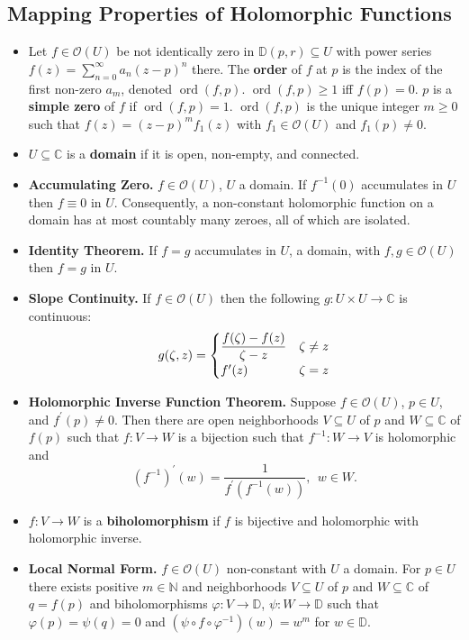 \documentclass{article}
\DeclareMathOperator{\order}{ord}
\newenvironment{topic}[1]{%
{\subsection{#1}}%
\begin{itemize}%
}{%
\end{itemize}%
}
\newcommand{\theorem}[1]{\item {\bf #1.}}
\newcommand{\lemma}[1]{\item {\bf #1.}}
\newcommand{\term}[1]{{\bf #1}}
\newcommand{\holo}[1]{\mathcal{O}(#1)}
\newcommand{\remark}{\item}
\newcommand{\udisk}{\mathbb{D}}
\newcommand{\disk}[2]{\mathbb{D}(#1, #2)}
\begin{document}
\begin{topic}{Mapping Properties of Holomorphic Functions}

\remark Let $f \in \holo{U}$ be not identically zero in $\disk{p}{r} \subseteq U$ with power series $f(z) = \sum_{n=0}^\infty a_n (z - p)^n$ there. The \term{order} of $f$ at $p$ is the index of the first non-zero $a_m$, denoted $\order(f, p)$. $\order(f, p) \geq 1$ iff $f(p) = 0$. $p$ is a \term{simple zero} of $f$ if $\order(f, p) = 1$. $\order(f, p)$ is the unique integer $m \geq 0$ such that $f(z) = (z - p)^m f_1(z)$ with $f_1 \in \holo{U}$ and $f_1(p) \neq 0$.

\remark $U \subseteq \mathbb{C}$ is a \term{domain} if it is open, non-empty, and connected.

\lemma{Accumulating Zero} $f \in \holo{U}$, $U$ a domain. If $f^{-1}(0)$ accumulates in $U$ then $f \equiv 0$ in $U$. Consequently, a non-constant holomorphic function on a domain has at most countably many zeroes, all of which are isolated.

\theorem{Identity Theorem} If $f = g$ accumulates in $U$, a domain, with $f, g \in \holo{U}$ then $f = g$ in $U$.

\lemma{Slope Continuity} If $f \in \holo{U}$ then the following $g : U \times U \to \mathbb{C}$ is continuous: $$\renewcommand{\arraystretch}{1.2}g(\zeta, z) =
\begin{cases}
\dfrac{f(\zeta) - f(z)}{\zeta - z}&\zeta \neq z\\
f^\prime(z)&\zeta = z
\end{cases}\renewcommand{\arraystretch}{1.0}$$

\theorem{Holomorphic Inverse Function Theorem} Suppose $f \in \holo{U}$, $p \in U$, and $f^\prime(p) \neq 0$. Then there are open neighborhoods $V \subseteq U$ of $p$ and $W \subseteq \mathbb{C}$ of $f(p)$ such that $f : V \to W$ is a bijection such that $f^{-1} : W \to V$ is holomorphic and $$\left(f^{-1}\right)^\prime(w) = \dfrac{1}{f^\prime(f^{-1}(w))},~~w \in W.$$

\remark $f : V \to W$ is a \term{biholomorphism} if $f$ is bijective and holomorphic with holomorphic inverse.

\theorem{Local Normal Form} $f \in \holo{U}$ non-constant with $U$ a domain. For $p \in U$ there exists positive $m \in \mathbb{N}$ and neighborhoods $V \subseteq U$ of $p$ and $W \subseteq \mathbb{C}$ of $q = f(p)$ and biholomorphisms $\varphi : V \to \udisk$, $\psi : W \to \udisk$ such that $\varphi(p) = \psi(q) = 0$ and $(\psi \circ f \circ \varphi^{-1})(w) = w^m$ for $w \in \udisk$.


\end{topic}
\end{document}
